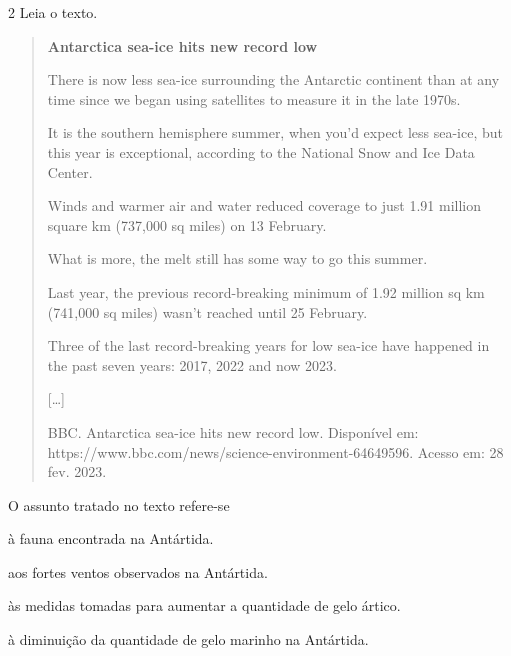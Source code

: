 
\num{2} Leia o texto.

\begin{quote}
\textbf{Antarctica sea-ice hits new record low}

There is now less sea-ice surrounding the Antarctic continent than at
any time since we began using satellites to measure it in the late
1970s.

It is the southern hemisphere summer, when you'd expect less sea-ice,
but this year is exceptional, according to the National Snow and Ice
Data Center.

Winds and warmer air and water reduced coverage to just 1.91 million
square km (737,000 sq miles) on 13 February.

What is more, the melt still has some way to go this summer.

Last year, the previous record-breaking minimum of 1.92 million sq km
(741,000 sq miles) wasn't reached until 25 February.

Three of the last record-breaking years for low sea-ice have happened in
the past seven years: 2017, 2022 and now 2023.

{[}\ldots{}{]}

BBC. Antarctica sea-ice hits new record low. Disponível em:
https://www.bbc.com/news/science-environment-64649596. Acesso em: 28
fev. 2023.
\end{quote}

O assunto tratado no texto refere-se

\begin{escolha}
\item à fauna encontrada na Antártida.

\item aos fortes ventos observados na Antártida.

\item às medidas tomadas para aumentar a quantidade de gelo ártico.

\item à diminuição da quantidade de gelo marinho na Antártida.
\end{escolha}

